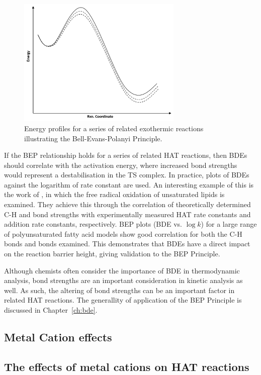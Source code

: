 \begin{figure}[htb]
  \centering
  \includegraphics[width=0.7\textwidth]{figures/bep}
  \caption{Energy profiles for a series of related exothermic reactions illustrating the Bell-Evans-Polanyi Principle.}
\label{fig:bep}
\end{figure}

If the BEP relationship holds for a series of related HAT reactions, then BDEs should correlate with the activation energy, where increased bond strengths would represent a destabilisation in the TS complex. In practice, plots of BDEs against the logarithm of rate constant are used. An interesting example of this is the work of \citet{Pratt2003}, in which the free radical oxidation of unsaturated lipids is examined. They achieve this through the correlation of theoretically determined C-H and  bond strengths with experimentally measured HAT rate constants and  addition rate constants, respectively. BEP plots (BDE vs. $\log k$) for a large range of polyunsaturated fatty acid models show good correlation for both the C-H bonds and  bonds examined. This demonstrates that BDEs have a direct impact on the reaction barrier height, giving validation to the BEP Principle.

Although chemists often consider the importance of BDE in thermodynamic analysis, bond strengths are an important consideration in kinetic analysis as well. As such, the altering of bond strengths can be an important factor in related HAT reactions. The generallity of application of the BEP Principle is discussed in Chapter~\ref{ch:bde}.

\subsection{Metal Cation effects}
\subsection{The effects of metal cations on HAT reactions}

